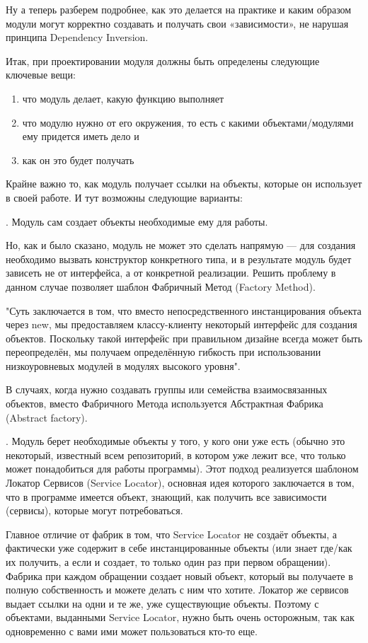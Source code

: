 \documentclass[a4paper]{article}
\begin{document}
Ну а теперь разберем подробнее, как это делается на практике и каким образом модули могут корректно создавать и получать свои «зависимости», не нарушая принципа Dependency Inversion.

Итак, при проектировании модуля должны быть определены следующие ключевые вещи:
\begin{enumerate}
        \item что модуль делает, какую функцию выполняет
    \item что модулю нужно от его окружения, то есть с какими объектами/модулями ему придется иметь дело и
      \item как он это будет получать
\end{enumerate}

Крайне важно то, как модуль получает ссылки на объекты, которые он использует в своей работе. И тут возможны следующие варианты:

. Модуль сам создает объекты необходимые ему для работы.

Но, как и было сказано, модуль не может это сделать напрямую — для создания необходимо вызвать конструктор конкретного типа, и в результате модуль будет зависеть не от интерфейса, а от конкретной реализации. Решить проблему в данном случае позволяет шаблон Фабричный Метод (Factory Method).

"Суть заключается в том, что вместо непосредственного инстанцирования объекта через new, мы предоставляем классу-клиенту некоторый интерфейс для создания объектов. Поскольку такой интерфейс при правильном дизайне всегда может быть переопределён, мы получаем определённую гибкость при использовании низкоуровневых модулей в модулях высокого уровня".

В случаях, когда нужно создавать группы или семейства взаимосвязанных объектов, вместо Фабричного Метода используется Абстрактная Фабрика (Abstract factory).

. Модуль берет необходимые объекты у того, у кого они уже есть (обычно это некоторый, известный всем репозиторий, в котором уже лежит все, что только может понадобиться для работы программы).
Этот подход реализуется шаблоном Локатор Сервисов (Service Locator), основная идея которого заключается в том, что в программе имеется объект, знающий, как получить все зависимости (сервисы), которые могут потребоваться.

Главное отличие от фабрик в том, что Service Locator не создаёт объекты, а фактически уже содержит в себе инстанцированные объекты (или знает где/как их получить, а если и создает, то только один раз при первом обращении). Фабрика при каждом обращении создает новый объект, который вы получаете в полную собственность и можете делать с ним что хотите. Локатор же сервисов выдает ссылки на одни и те же, уже существующие объекты. Поэтому с объектами, выданными Service Locator, нужно быть очень осторожным, так как одновременно с вами ими может пользоваться кто-то еще.
\end{document}
